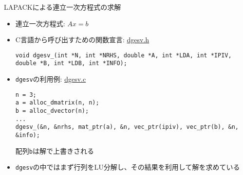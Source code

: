 \begin{frame}[t,fragile]{LAPACKによる連立一次方程式の求解}
  \begin{itemize}
  \item 連立一次方程式: $Ax=b$
  \item C言語から呼び出すための関数宣言: \href{https://github.com/todo-group/computer-experiments/blob/master/exercise/linear_system/dgesv.h}{dgesv.h}
\begin{lstlisting}
void dgesv_(int *N, int *NRHS, double *A, int *LDA, int *IPIV, double *B, int *LDB, int *INFO);
\end{lstlisting}
  \item {\tt dgesv}の利用例: \href{https://github.com/todo-group/computer-experiments/blob/master/exercise/linear_system/dgesv.c}{dgesv.c}
\begin{lstlisting}
n = 3;
a = alloc_dmatrix(n, n);
b = alloc_dvector(n);
...
dgesv_(&n, &nrhs, mat_ptr(a), &n, vec_ptr(ipiv), vec_ptr(b), &n, &info);
\end{lstlisting}
配列{\tt b}は解で上書きされる
  \item {\tt dgesv}の中ではまず行列をLU分解し、その結果を利用して解を求めている
  \end{itemize}
\end{frame}
